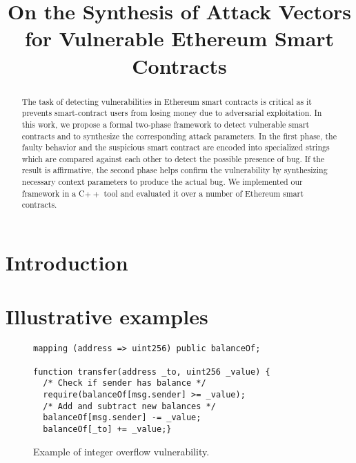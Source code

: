 \documentclass[runningheads]{llncs}
\begin{document}
%
\title{On the Synthesis of Attack Vectors for Vulnerable Ethereum Smart Contracts}
%
%
\author{}
%
\authorrunning{}
%
%
\maketitle              %
%
\begin{abstract}
The task of detecting vulnerabilities in Ethereum smart contracts is critical as it prevents smart-contract users from losing money due to adversarial exploitation. In this work, we propose a formal two-phase framework to detect vulnerable smart contracts and to synthesize the corresponding attack parameters. In the first phase, the faulty behavior and the suspicious smart contract are encoded into specialized strings which are compared against each other to detect the possible presence of bug. If the result is affirmative, the second phase helps confirm the vulnerability by synthesizing necessary context parameters to produce the actual bug. We implemented our framework in a C{$++$} tool and evaluated it over a number of Ethereum smart contracts.
\end{abstract}

\section{Introduction}


\section{Illustrative examples}
\begin{figure}
	\begin{lstlisting}[language=Solidity]
mapping (address => uint256) public balanceOf;

function transfer(address _to, uint256 _value) {
  /* Check if sender has balance */
  require(balanceOf[msg.sender] >= _value);
  /* Add and subtract new balances */
  balanceOf[msg.sender] -= _value;
  balanceOf[_to] += _value;}
	\end{lstlisting}
	\caption{Example of integer overflow vulnerability.}\label{fig:ex1}
\end{figure}
\end{document}

